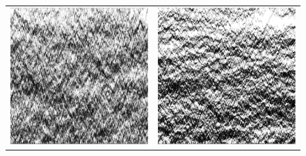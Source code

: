 \begin{figure}[h!]
\begin{center}
\begin{tabular}{c | c}
    \includegraphics[width=0.49\linewidth]{../tex-src/images/newFlowImps/longTime} &\includegraphics[width=0.49\linewidth]{../tex-src/images/newFlowImps/midLongTime}
    \end{tabular}
\end{center}
    \vspace{-2em}
\end{figure}

